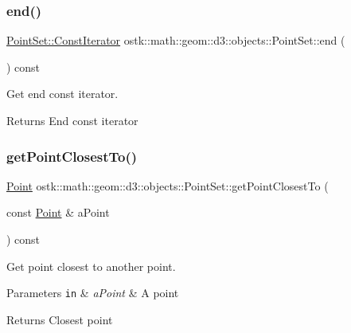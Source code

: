 \subsubsection{\texorpdfstring{end()}{end()}}
{\footnotesize\ttfamily \hyperlink{classostk_1_1math_1_1geom_1_1d3_1_1objects_1_1_point_set_aa87eb9a571cb8b420e8c404005a2b723}{Point\+Set\+::\+Const\+Iterator} ostk\+::math\+::geom\+::d3\+::objects\+::\+Point\+Set\+::end (\begin{DoxyParamCaption}{ }\end{DoxyParamCaption}) const}



Get end const iterator. 

\begin{DoxyReturn}{Returns}
End const iterator 
\end{DoxyReturn}
\mbox{\label{classostk_1_1math_1_1geom_1_1d3_1_1objects_1_1_point_set_a55f63833c4c6fe3481a4f8833701907a}} 
\subsubsection{\texorpdfstring{get\+Point\+Closest\+To()}{getPointClosestTo()}}
{\footnotesize\ttfamily \hyperlink{classostk_1_1math_1_1geom_1_1d3_1_1objects_1_1_point}{Point} ostk\+::math\+::geom\+::d3\+::objects\+::\+Point\+Set\+::get\+Point\+Closest\+To (\begin{DoxyParamCaption}\item[{const \hyperlink{classostk_1_1math_1_1geom_1_1d3_1_1objects_1_1_point}{Point} \&}]{a\+Point }\end{DoxyParamCaption}) const}



Get point closest to another point. 


\begin{DoxyParams}[1]{Parameters}
\mbox{\tt in}  & {\em a\+Point} & A point \\
\hline
\end{DoxyParams}
\begin{DoxyReturn}{Returns}
Closest point 
\end{DoxyReturn}
\mbox{\label{classostk_1_1math_1_1geom_1_1d3_1_1objects_1_1_point_set_a8c773ea027260feeb3b24298d075f228}} 
